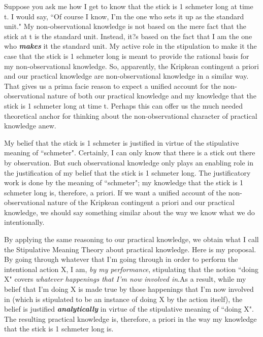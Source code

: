 \documentclass[a4paper,12pt]{article}
\begin{document}
Suppose you ask me how I get to know that the stick is 1 schmeter long at time t. I would say, ``Of course I know, I'm the one who sets it up as the standard unit." My non-observational knowledge is not based on the mere fact that the stick at t is the standard unit. Instead, it?s based on the fact that I am the one who \emph{\textbf{makes}} it the standard unit. My active role in the stipulation to make it the case that the stick is 1 schmeter long is meant to provide the rational basis for my non-observational knowledge. So, apparently, the Kripkean contingent a priori and our practical knowledge are non-observational knowledge in a similar way. That gives us a prima facie reason to expect a unified account for the non-observational nature of both our practical knowledge and my knowledge that the stick is 1 schmeter long at time t. Perhaps this can offer us the much needed theoretical anchor for thinking about the non-observational character of practical knowledge anew.

My belief that the stick is 1 schmeter is justified in virtue of the stipulative meaning of ``schmeter". Certainly, I can only know that there is a stick out there by observation. But such observational knowledge only plays an enabling role in the justification of my belief that the stick is 1 schmeter long. The justificatory work is done by the meaning of ``schmeter"; my knowledge that the stick is 1 schmeter long is, therefore, a priori. If we want a unified account of the non-observational nature of the Kripkean contingent a priori and our practical knowledge, we should say something similar about the way we know what we do intentionally.

By applying the same reasoning to our practical knowledge, we obtain what I call the Stipulative Meaning Theory about practical knowledge. Here is my proposal. By going through whatever that I'm going through in order to perform the intentional action X, I am, \emph{by my performance}, stipulating that the notion ``doing X" covers \emph{whatever happenings that I'm now involved in}.\footnotemark As a result, while my belief that I'm doing X is made true by those happenings that I'm now involved in (which is stipulated to be an instance of doing X by the action itself), the belief is justified \emph{\textbf{analytically}} in virtue of the stipulative meaning of ``doing X". The resulting practical knowledge is, therefore, a priori in the way my knowledge that the stick is 1 schmeter long is.

\end{document}
